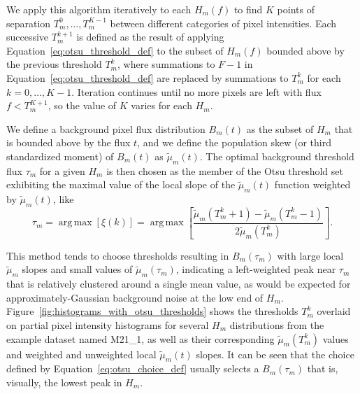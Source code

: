 \documentclass[letterpaper,11pt]{article}
\newcommand{\reffig}[1]{Figure~\ref{#1}}
\newcommand{\refeq}[1]{Equation~\ref{#1}}
\DeclareMathOperator*{\argmax}{arg\,max}
\begin{document}
We apply this algorithm iteratively to each $H_{m}(f)$ to find $K$ points of separation $T^{0}_{m}, \ldots, T^{K-1}_{m}$ between different categories of pixel intensities. Each successive $T^{k+1}_{m}$ is defined as the result of applying \refeq{eq:otsu_threshold_def} to the subset of $H_{m}(f)$ bounded above by the previous threshold $T^{k}_{m}$, where summations to $F-1$ in \refeq{eq:otsu_threshold_def} are replaced by summations to $T^{k}_{m}$ for each $k=0,\ldots,K-1$. Iteration continues until no more pixels are left with flux $f<T^{K+1}_{m}$, so the value of $K$ varies for each $H_{m}$.

We define a background pixel flux distribution $B_{m}(t)$ as the subset of $H_{m}$ that is bounded above by the flux $t$, and we define the population skew (or third standardized moment) of $B_{m}(t)$ as $\widetilde{\mu}_{m}(t)$. The optimal background threshold flux $\tau_{m}$ for a given $H_{m}$ is then chosen as the member of the Otsu threshold set exhibiting the maximal value of the local slope of the $\widetilde{\mu}_{m}(t)$ function weighted by $\widetilde{\mu}_{m}(t)$, like
\begin{equation}
\tau_{m} = \argmax{\left[ \xi(k) \right]} = \argmax{ \left[ \frac{ \widetilde{\mu}_{m}(T^{k}_{m}+1) - \widetilde{\mu}_{m}(T^{k}_{m}-1) }{ 2 \widetilde{\mu}_{m}(T^{k}_{m}) } \right] } .
\label{eq:otsu_choice_def}
\end{equation}

This method tends to choose thresholds resulting in $B_{m}(\tau_{m})$ with large local $\widetilde{\mu}_{m}$ slopes and small values of $\widetilde{\mu}_{m}(\tau_{m})$, indicating a left-weighted peak near $\tau_{m}$ that is relatively clustered around a single mean value, as would be expected for approximately-Gaussian background noise at the low end of $H_{m}$. \reffig{fig:histograms_with_otsu_thresholds} shows the thresholds $T^{k}_{m}$ overlaid on partial pixel intensity histograms for several $H_{m}$ distributions from the example dataset named M21\_1, as well as their corresponding $\widetilde{\mu}_{m}(T^{k}_{m})$ values and weighted and unweighted local $\widetilde{\mu}_{m}(t)$ slopes. It can be seen that the choice defined by \refeq{eq:otsu_choice_def} usually selects a $B_{m}(\tau_{m})$ that is, visually, the lowest peak in $H_{m}$.
\end{document}
